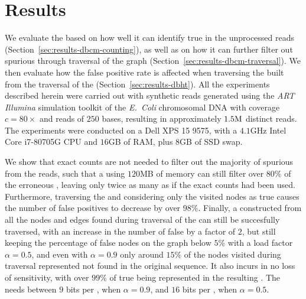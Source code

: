 \chapter{Results}\label{chap:results}

We evaluate the \dBCM based on how well it can identify true  in the unprocessed reads (Section~\ref{sec:results-dbcm-counting}), as well as on how it can further filter out spurious  through traversal of the graph (Section~\ref{sec:results-dbcm-traversal}). We then evaluate how the false positive rate is affected when traversing the \dBHT built from the traversal of the \dBCM (Section~\ref{sec:results-dbht}). All the experiments described herein were carried out with synthetic reads generated using the \emph{ART Illumina} simulation toolkit \cite{Huang2011} of the \emph{E.~Coli} chromosomal DNA \cite{ecoligenome} with coverage $c = 80\times$ and reads of $250$ bases, resulting in approximately $1.5\mega$ distinct reads. The experiments were conducted on a Dell XPS 15 9575, with a $4.1$GHz Intel Core i7-80705G CPU and $16$GB of RAM, plus $8$GB of SSD swap.

We show that exact counts are not needed to filter out the majority of spurious  from the reads, such that a \dBCM using $120$MB of memory can still filter over $80\%$ of the erroneous , leaving only twice as many as if the exact counts had been used. Furthermore, traversing the \dBCM and considering only the visited nodes as true  causes the number of false positives to decrease by over $98\%$. Finally, a \dBHT constructed from all the nodes and edges found during traversal of the \dBCM can still be succesfully traversed, with an increase in the number of false  by a factor of $2$, but still keeping the percentage of false nodes on the graph below $5\%$ with a load factor $\alpha = 0.5$, and even with $\alpha = 0.9$ only around $15\%$ of the nodes visited during traversal represented  not found in the original sequence. It also incurs in no loss of sensitivity, with over $99\%$ of true  being represented in the resulting \dBG. The \dBHT needs between $9$ bits per \kmer, when $\alpha = 0.9$, and $16$ bits per \kmer, when $\alpha = 0.5$. 

